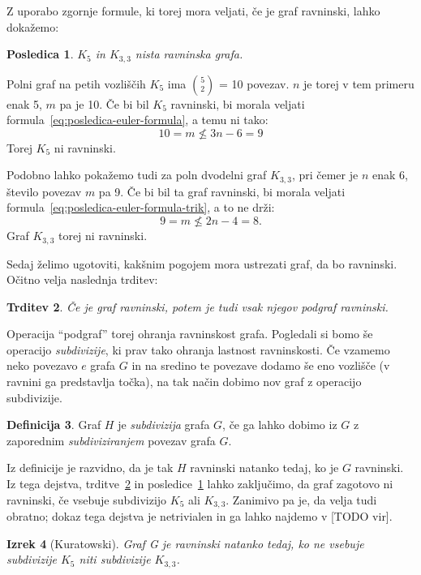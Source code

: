 \documentclass[12pt,a4paper]{amsart}
\theoremstyle{definition} %
\newtheorem{definicija}{Definicija}[section]
\theoremstyle{plain} %
\newtheorem{izrek}[definicija]{Izrek}
\newtheorem{trditev}[definicija]{Trditev}
\newtheorem{posledica}[definicija]{Posledica}
\newcommand{\N}{\mathbb N}
\newcommand{\graf}[1][G]{\ensuremath{#1 = (V(#1), E(#1))}}
\newcommand{\vozlisca}[1][G]{\ensuremath{V(#1)}}
\newcommand{\povezave}[1][G]{\ensuremath{E(#1)}}
\begin{document}
Z uporabo zgornje formule, ki torej mora veljati, če je graf ravninski, lahko dokažemo:
\begin{posledica}
    \label{posl:neravninska-grafa}
    $K_5$ in $K_{3,3}$ nista ravninska grafa.
\end{posledica}

\proof
    Polni graf na petih vozliščih $K_5$ ima {$5 \choose 2$} = 10 povezav. $n$ je torej v tem primeru enak
    5, $m$ pa je 10. Če bi bil $K_5$ ravninski, bi morala veljati formula~\eqref{eq:posledica-euler-formula},
    a temu ni tako:
    \[ 10 = m \nleq 3n - 6 = 9 \]
    Torej $K_5$ ni ravninski.
    
    Podobno lahko pokažemo tudi za poln dvodelni graf $K_{3,3}$, pri čemer je $n$ enak 6, število povezav $m$ pa 9. Če bi bil ta graf ravninski, bi morala veljati formula~\eqref{eq:posledica-euler-formula-trik}, a to ne drži:
    \[ 9 = m \nleq 2n - 4 = 8. \] 
    Graf $K_{3,3}$ torej ni ravninski. \qedhere
\endproof

Sedaj želimo ugotoviti, kakšnim pogojem mora ustrezati graf, da bo ravninski. Očitno velja naslednja trditev:

\begin{trditev}
    \label{trd:podgraf}
    Če je graf ravninski, potem je tudi vsak njegov podgraf ravninski. %
\end{trditev}

Operacija ``podgraf'' torej ohranja ravninskost grafa.
Pogledali si bomo še operacijo \emph{subdivizije}, ki prav tako ohranja lastnost ravninskosti. Če vzamemo neko povezavo $e$ grafa $G$ in na sredino te povezave dodamo še eno vozlišče (v ravnini ga predstavlja točka), na tak način dobimo nov graf z operacijo subdivizije. \cite[str.~66]{bib:potocnik}

\begin{definicija}
    Graf $H$ je \emph{subdivizija} grafa $G$, če ga lahko dobimo iz $G$ z zaporednim \emph{subdiviziranjem} povezav grafa $G$.\cite[str.~66]{bib:potocnik}
\end{definicija}

Iz definicije je razvidno, da je tak $H$ ravninski natanko tedaj, ko je $G$ ravninski. Iz tega dejstva, trditve~\ref{trd:podgraf} in posledice~\ref{posl:neravninska-grafa} lahko zaključimo, da graf zagotovo ni ravninski, če vsebuje subdivizijo $K_5$ ali $K_{3,3}$. Zanimivo pa je, da velja tudi obratno; dokaz tega dejstva je netrivialen in ga lahko najdemo v [TODO vir].

\begin{izrek}[Kuratowski]
    \label{izr:kuratowski}
    Graf G je ravninski natanko tedaj, ko ne vsebuje subdivizije $K_5$ niti subdivizije $K_{3,3}$.
\end{izrek}
\end{document}
